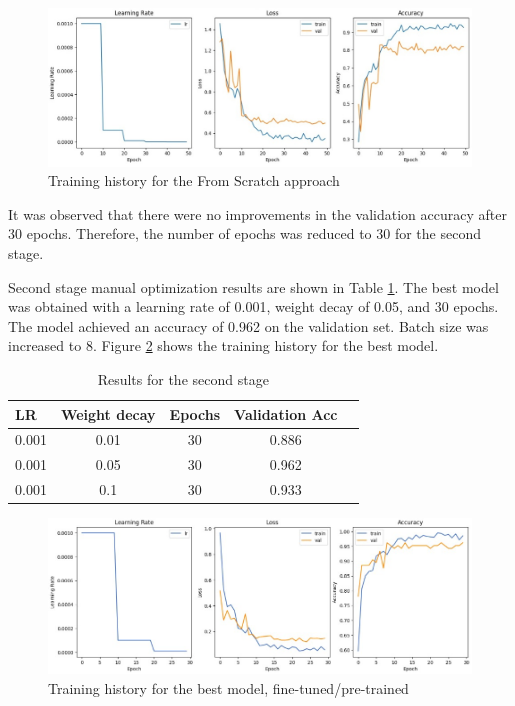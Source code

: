 \documentclass[preprint,12pt,3p,times]{elsarticle}
\begin{document}
\begin{figure}[H]
	\centering
	\includegraphics[width=\textwidth]{images/fromscratch.jpg}
	\caption{Training history for the From Scratch approach}
	\label{fig:stage1}
\end{figure}

It was observed that there were no improvements in the validation accuracy after 30 epochs. Therefore, the number of epochs was reduced to 30 for the second stage. 

Second stage manual optimization results are shown in Table \ref{tab:stage2}. The best model was obtained with a learning rate of 0.001, weight decay of 0.05, and 30 epochs. The model achieved an accuracy of 0.962 on the validation set. Batch size was increased to 8. Figure \ref{fig:stage2} shows the training history for the best model.

\begin{table}[H]
	\centering
	\begin{tabular}{|l|c|c|c|c|}
	\hline
	\textbf{LR} & \textbf{Weight decay} & \textbf{Epochs} & \textbf{Validation Acc} \\ \hline
	0.001 & 0.01 & 30 & 0.886 \\ \hline
	0.001 & 0.05 & 30 & 0.962 \\ \hline
	0.001 & 0.1 & 30 & 0.933 \\ \hline
	\end{tabular}
	\caption{Results for the second stage}
	\label{tab:stage2}
\end{table}

\begin{figure}[H]
	\centering
	\includegraphics[width=\textwidth]{images/stage2.jpg}
	\caption{Training history for the best model, fine-tuned/pre-trained}
	\label{fig:stage2}
\end{figure}
\end{document}

